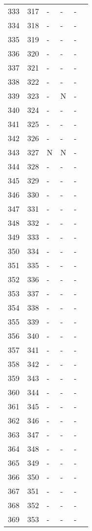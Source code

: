 \documentclass[10pt]{article}
\begin{document}
\begin{longtable}{llllll}
  333 & 317 & - & - & - &  \\ 
  334 & 318 & - & - & - &  \\ 
  335 & 319 & - & - & - &  \\ 
  336 & 320 & - & - & - &  \\ 
  337 & 321 & - & - & - &  \\ 
  338 & 322 & - & - & - &  \\ 
  339 & 323 & - & N & - &  \\ 
  340 & 324 & - & - & - &  \\ 
  341 & 325 & - & - & - &  \\ 
  342 & 326 & - & - & - &  \\ 
  343 & 327 & N & N & - &  \\ 
  344 & 328 & - & - & - &  \\ 
  345 & 329 & - & - & - &  \\ 
  346 & 330 & - & - & - &  \\ 
  347 & 331 & - & - & - &  \\ 
  348 & 332 & - & - & - &  \\ 
  349 & 333 & - & - & - &  \\ 
  350 & 334 & - & - & - &  \\ 
  351 & 335 & - & - & - &  \\ 
  352 & 336 & - & - & - &  \\ 
  353 & 337 & - & - & - &  \\ 
  354 & 338 & - & - & - &  \\ 
  355 & 339 & - & - & - &  \\ 
  356 & 340 & - & - & - &  \\ 
  357 & 341 & - & - & - &  \\ 
  358 & 342 & - & - & - &  \\ 
  359 & 343 & - & - & - &  \\ 
  360 & 344 & - & - & - &  \\ 
  361 & 345 & - & - & - &  \\ 
  362 & 346 & - & - & - &  \\ 
  363 & 347 & - & - & - &  \\ 
  364 & 348 & - & - & - &  \\ 
  365 & 349 & - & - & - &  \\ 
  366 & 350 & - & - & - &  \\ 
  367 & 351 & - & - & - &  \\ 
  368 & 352 & - & - & - &  \\ 
  369 & 353 & - & - & - &  \\ 

\end{longtable}
\end{document}
